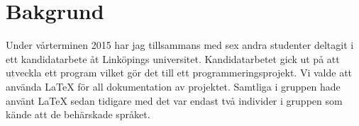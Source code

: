 \section{Bakgrund}
Under vårterminen 2015 har jag tillsammans med sex andra studenter deltagit i ett kandidatarbete åt Linköpings universitet. Kandidatarbetet gick ut på att utveckla ett program vilket gör det till ett programmeringsprojekt. Vi valde att använda {\LaTeX} för all dokumentation av projektet. Samtliga i gruppen hade använt {\LaTeX} sedan tidigare med det var endast två individer i gruppen som kände att de behärskade språket.   
